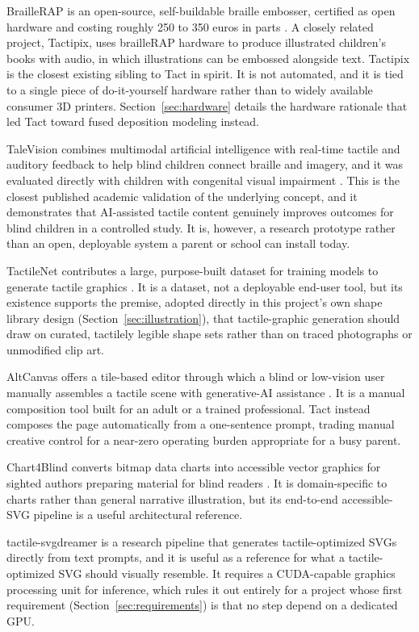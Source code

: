 \documentclass[conference]{IEEEtran}
\begin{document}
BrailleRAP is an open-source, self-buildable braille embosser, certified as open hardware and costing roughly 250 to 350 euros in parts \cite{braillerap}. A closely related project, Tactipix, uses brailleRAP hardware to produce illustrated children's books with audio, in which illustrations can be embossed alongside text. Tactipix is the closest existing sibling to Tact in spirit. It is not automated, and it is tied to a single piece of do-it-yourself hardware rather than to widely available consumer 3D printers. Section~\ref{sec:hardware} details the hardware rationale that led Tact toward fused deposition modeling instead.

TaleVision combines multimodal artificial intelligence with real-time tactile and auditory feedback to help blind children connect braille and imagery, and it was evaluated directly with children with congenital visual impairment \cite{talevision}. This is the closest published academic validation of the underlying concept, and it demonstrates that AI-assisted tactile content genuinely improves outcomes for blind children in a controlled study. It is, however, a research prototype rather than an open, deployable system a parent or school can install today.

TactileNet contributes a large, purpose-built dataset for training models to generate tactile graphics \cite{tactilenet}. It is a dataset, not a deployable end-user tool, but its existence supports the premise, adopted directly in this project's own shape library design (Section~\ref{sec:illustration}), that tactile-graphic generation should draw on curated, tactilely legible shape sets rather than on traced photographs or unmodified clip art.

AltCanvas offers a tile-based editor through which a blind or low-vision user manually assembles a tactile scene with generative-AI assistance \cite{altcanvas}. It is a manual composition tool built for an adult or a trained professional. Tact instead composes the page automatically from a one-sentence prompt, trading manual creative control for a near-zero operating burden appropriate for a busy parent.

Chart4Blind converts bitmap data charts into accessible vector graphics for sighted authors preparing material for blind readers \cite{chart4blind}. It is domain-specific to charts rather than general narrative illustration, but its end-to-end accessible-SVG pipeline is a useful architectural reference.

tactile-svgdreamer is a research pipeline that generates tactile-optimized SVGs directly from text prompts, and it is useful as a reference for what a tactile-optimized SVG should visually resemble. It requires a CUDA-capable graphics processing unit for inference, which rules it out entirely for a project whose first requirement (Section~\ref{sec:requirements}) is that no step depend on a dedicated GPU.
\end{document}
